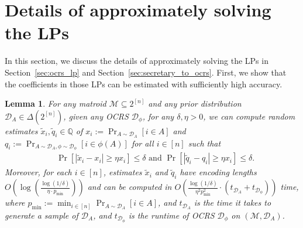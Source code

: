 \documentclass[11pt]{article}
\newcommand{\D}{\mathcal D}
\newcommand{\M}{{\mathcal M}}
\newcommand{\Q}{{\mathbb Q}}
\newtheorem{lemma}[theorem]{Lemma}
\begin{document}
\section{Details of approximately solving the LPs}\label{sec:approximate_lp_solving}
In this section, we discuss the details of approximately solving the LPs in Section~\ref{sec:ocrs_lp} and Section~\ref{sec:secretary_to_ocrs}. First, we show that the coefficients in those LPs can be estimated with sufficiently high accuracy.
\begin{lemma}\label{lem:estimating_lp_coefficients}
For any matroid $\M\subseteq2^{[n]}$ and any prior distribution $\D_A\in\Delta(2^{[n]})$, given any OCRS $\D_{\phi}$, for any $\delta,\eta>0$, we can compute random estimates $\tilde{x}_i,\tilde{q}_i\in\Q$ of $x_i:=\Pr_{A\sim\D_A}[i\in A]$ and $q_i:=\Pr_{A\sim\D_A,\phi\sim\D_{\phi}}[i\in \phi(A)]$ for all $i\in[n]$ such that
\begin{align*}
&\Pr\left[|\tilde{x}_i-x_i|\ge\eta x_i\right]\le\delta  \text{ and }\Pr\left[|\tilde{q}_i-q_i|\ge\eta x_i\right]\le\delta.
\end{align*}
Moreover, for each $i\in[n]$, estimates $\tilde{x}_i$ and $\tilde{q}_i$ have encoding lengths $O\left(\log\left(\frac{\log(1/\delta)}{\eta\cdot p_{\min}}\right)\right)$ and can be computed in $O\left(\frac{\log(1/\delta)}{\eta^2p_{\min}^2}\cdot(t_{\D_{A}}+t_{\D_{\phi}})\right)$ time, where $p_{\min}:=\min_{i\in[n]}\Pr_{A\sim\D_A}[i\in A]$, and $t_{\D_A}$ is the time it takes to generate a sample of $\D_A$, and $t_{\D_{\phi}}$ is the runtime of OCRS $\D_{\phi}$ on $(\M,\D_A)$.
\end{lemma}
\end{document}
